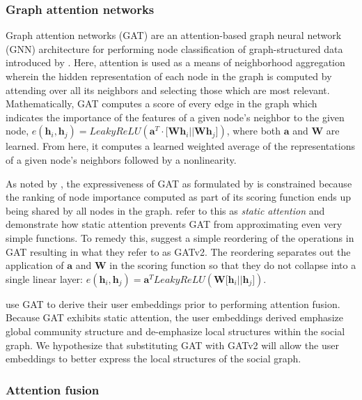 \documentclass[letterpaper]{article} %
\begin{document}
\subsubsection{Graph attention networks}

Graph attention networks (GAT) are an attention-based graph neural network (GNN) architecture for performing node classification of graph-structured data introduced by \citet{Vel2017}. Here, attention is used as a means of neighborhood aggregation wherein the hidden representation of each node in the graph is computed by attending over all its neighbors and selecting those which are most relevant.  Mathematically, GAT computes a score of every edge in the graph which indicates the importance of the features of a given node's neighbor to the given node, $e(\mathbf{h}_i, \mathbf{h}_j)=LeakyReLU(\bm{a}^T \cdot \lbrack \mathbf{Wh}_i || \mathbf{Wh}_j \rbrack)$, where both $\bm{a}$ and $\mathbf{W}$ are learned. From here, it computes a learned weighted average of the representations of a given node's neighbors followed by a nonlinearity. 

As noted by \citet{Brody2021}, the expressiveness of GAT as formulated by \citet{Vel2017} is constrained because the ranking of node importance computed as part of its scoring function ends up being shared by all nodes in the graph. \citet{Brody2021} refer to this as \textit{static attention} and demonstrate how static attention prevents GAT from approximating even very simple functions. To remedy this, \citet{Brody2021} suggest a simple reordering of the operations in GAT resulting in what they refer to as GATv2. The reordering separates out the application of $\bm{a}$ and $\mathbf{W}$ in the scoring function so that they do not collapse into a single linear layer: $e(\mathbf{h}_i, \mathbf{h}_j)=\bm{a}^T LeakyReLU(\mathbf{W} \lbrack \mathbf{h}_i || \mathbf{h}_j \rbrack)$. 

\citet{Miao2022} use GAT to derive their user embeddings prior to performing attention fusion. Because GAT exhibits static attention, the user embeddings derived emphasize global community structure and de-emphasize local structures within the social graph. We hypothesize that substituting GAT with GATv2 will allow the user embeddings to better express the local structures of the social graph.

\subsubsection{Attention fusion}
\end{document}
